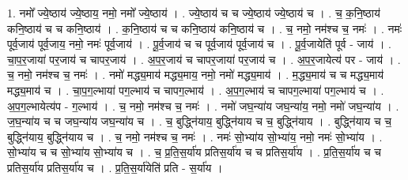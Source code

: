 \documentclass[17pt]{extarticle}
\begin{document}
1. नमो᳚ ज्ये॒ष्ठाय॑ ज्ये॒ष्ठाय॒ नमो॒ नमो᳚ ज्ये॒ष्ठाय॑ । . ज्ये॒ष्ठाय॑ च च ज्ये॒ष्ठाय॑ ज्ये॒ष्ठाय॑ च । . च॒ क॒नि॒ष्ठाय॑ कनि॒ष्ठाय॑ च च कनि॒ष्ठाय॑ । . क॒नि॒ष्ठाय॑ च च कनि॒ष्ठाय॑ कनि॒ष्ठाय॑ च । . च॒ नमो॒ नम॑श्च च॒ नमः॑ । . नमः॑ पूर्व॒जाय॑ पूर्व॒जाय॒ नमो॒ नमः॑ पूर्व॒जाय॑ । . पू॒र्व॒जाय॑ च च पूर्व॒जाय॑ पूर्व॒जाय॑ च । . पू॒र्व॒जायेति॑ पूर्व - जाय॑ । . चा॒प॒र॒जाया॑ पर॒जाय॑ च चापर॒जाय॑ । . अ॒प॒र॒जाय॑ च चापर॒जाया॑ पर॒जाय॑ च । . अ॒प॒र॒जायेत्य॑ पर - जाय॑ । . च॒ नमो॒ नम॑श्च च॒ नमः॑ । . नमो॑ मद्ध्य॒माय॑ मद्ध्य॒माय॒ नमो॒ नमो॑ मद्ध्य॒माय॑ । . म॒द्ध्य॒माय॑ च च मद्ध्य॒माय॑ मद्ध्य॒माय॑ च । . चा॒प॒ग॒ल्भाया॑ पग॒ल्भाय॑ च चापग॒ल्भाय॑ । . अ॒प॒ग॒ल्भाय॑ च चापग॒ल्भाया॑ पग॒ल्भाय॑ च । . अ॒प॒ग॒ल्भायेत्य॑प - ग॒ल्भाय॑ । . च॒ नमो॒ नम॑श्च च॒ नमः॑ । . नमो॑ जघ॒न्या॑य जघ॒न्या॑य॒ नमो॒ नमो॑ जघ॒न्या॑य । . ज॒घ॒न्या॑य च च जघ॒न्या॑य जघ॒न्या॑य च । . च॒ बुद्ध्नि॑याय॒ बुद्ध्नि॑याय च च॒ बुद्ध्नि॑याय । . बुद्ध्नि॑याय च च॒ बुद्ध्नि॑याय॒ बुद्ध्नि॑याय च । . च॒ नमो॒ नम॑श्च च॒ नमः॑ । . नमः॑ सो॒भ्या॑य सो॒भ्या॑य॒ नमो॒ नमः॑ सो॒भ्या॑य । . सो॒भ्या॑य च च सो॒भ्या॑य सो॒भ्या॑य च । . च॒ प्र॒ति॒स॒र्या॑य प्रतिस॒र्या॑य च च प्रतिस॒र्या॑य । . प्र॒ति॒स॒र्या॑य च च प्रतिस॒र्या॑य प्रतिस॒र्या॑य च । . प्र॒ति॒स॒र्या॑येति॑ प्रति - स॒र्या॑य । \newline
\end{document}
